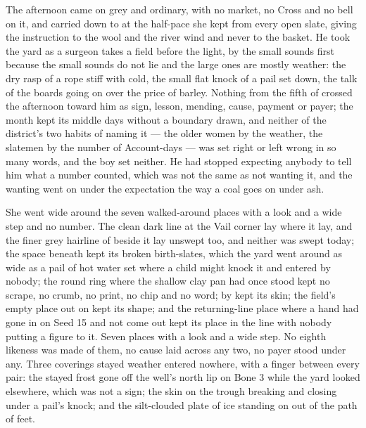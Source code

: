 The afternoon came on grey and ordinary, with no market, no Cross and no bell on it, and  carried  down to  at the half-pace she kept from every open slate, giving the instruction to the wool and the river wind and never to the basket. He took the yard as a surgeon takes a field before the light, by the small sounds first because the small sounds do not lie and the large ones are mostly weather: the dry rasp of a rope stiff with cold, the small flat knock of a pail set down, the talk of the boards going on over the price of barley. Nothing from the fifth of  crossed the afternoon toward him as sign, lesson, mending, cause, payment or payer; the month kept its middle days without a boundary drawn, and neither of the district's two habits of naming it --- the older women by the weather, the slatemen by the number of Account-days --- was set right or left wrong in so many words, and the boy set neither. He had stopped expecting anybody to tell him what a number counted, which was not the same as not wanting it, and the wanting went on under the expectation the way a coal goes on under ash.

She went wide around the seven walked-around places with a look and a wide step and no number. The clean dark line at the Vail corner lay where it lay, and the finer grey hairline of  beside it lay unswept too, and neither was swept today; the space beneath  kept its broken birth-slates, which the yard went around as wide as a pail of hot water set where a child might knock it and entered by nobody; the round ring where the shallow clay pan had once stood kept no scrape, no crumb, no print, no chip and no word;  by  kept its skin; the field's empty place out on  kept its shape; and the returning-line place where a hand had gone in on Seed 15 and not come out kept its place in the line with nobody putting a figure to it. Seven places with a look and a wide step. No eighth likeness was made of them, no cause laid across any two, no payer stood under any. Three coverings stayed weather entered nowhere, with a finger between every pair: the stayed frost gone off the well's north lip on Bone 3 while the yard looked elsewhere, which was not a sign; the skin on the trough breaking and closing under a pail's knock; and the silt-clouded plate of ice standing on  out of the path of feet.

